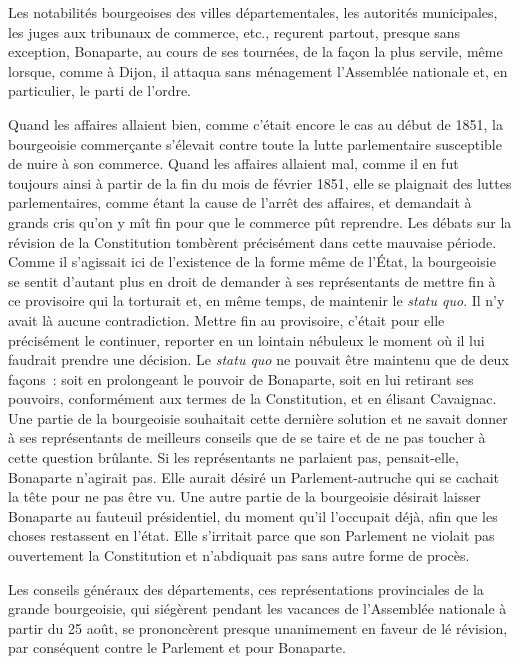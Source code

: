 \documentclass[french,twoside]{book} %
\begin{document}
Les notabilités bourgeoises des villes départementales, les autorités municipales, les juges aux tribunaux de commerce, etc., reçurent partout, presque sans exception, Bonaparte, au cours de ses tournées, de la façon la plus servile, même lorsque, comme à Dijon, il attaqua sans ménagement l’Assemblée nationale et, en particulier, le parti de l’ordre.\par
Quand les affaires allaient bien, comme c’était encore le cas au début de 1851, la bourgeoisie commerçante s’élevait contre toute la lutte parlementaire susceptible de nuire à son commerce. Quand les affaires allaient mal, comme il en fut toujours ainsi à partir de la fin du mois de février 1851, elle se plaignait des luttes parlementaires, comme étant la cause de l’arrêt des affaires, et demandait à grands cris qu’on y mît fin pour que le commerce pût reprendre. Les débats sur la révision de la Constitution tombèrent précisément dans cette mauvaise période. Comme il s’agissait ici de l’existence de la forme même de l’État, la bourgeoisie se sentit d’autant plus en droit de demander à ses représentants de mettre fin à ce provisoire qui la torturait et, en même temps, de maintenir le \emph{statu quo}. Il n’y avait là aucune contradiction. Mettre fin au provisoire, c’était pour elle précisément le continuer, reporter en un lointain nébuleux le moment où il lui faudrait prendre une décision. Le \emph{statu quo} ne pouvait être maintenu que de deux façons : soit en prolongeant le pouvoir de Bonaparte, soit en lui retirant ses pouvoirs, conformément aux termes de la Constitution, et en élisant Cavaignac. Une partie de la bourgeoisie souhaitait cette dernière solution et ne savait donner à ses représentants de meilleurs conseils que de se taire et de ne pas toucher à cette question brûlante. Si les représentants ne parlaient pas, pensait-elle, Bonaparte n’agirait pas. Elle aurait désiré un Parlement-autruche qui se cachait la tête pour ne pas être vu. Une autre partie de la bourgeoisie désirait laisser Bonaparte au fauteuil présidentiel, du moment qu’il l’occupait déjà, afin que les choses restassent en l’état. Elle s’irritait parce que son Parlement ne violait pas ouvertement la Constitution et n’abdiquait pas sans autre forme de procès.\par
Les conseils généraux des départements, ces représentations provinciales de la grande bourgeoisie, qui siégèrent pendant les vacances de l’Assemblée nationale à partir du 25 août, se prononcèrent presque unanimement en faveur de lé révision, par conséquent contre le Parlement et pour Bonaparte.\par
\end{document}
